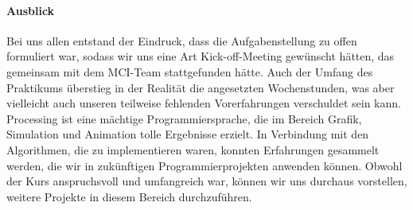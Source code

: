 \documentclass[../mciAusarbeitung.tex]{subfiles}
\begin{document}
\paragraph{Ausblick}
Bei uns allen entstand der Eindruck, dass die Aufgabenstellung zu offen formuliert war, sodass wir uns eine Art Kick-off-Meeting gewünscht hätten, das gemeinsam mit dem MCI-Team stattgefunden hätte. Auch der Umfang des Praktikums überstieg in der Realität die angesetzten Wochenstunden, was aber vielleicht auch unseren teilweise fehlenden Vorerfahrungen verschuldet sein kann. Processing ist eine mächtige Programmiersprache, die im Bereich Grafik, Simulation und Animation tolle Ergebnisse erzielt. In Verbindung mit den Algorithmen, die zu implementieren waren, konnten Erfahrungen gesammelt werden, die wir in zukünftigen Programmierprojekten anwenden können. Obwohl der Kurs anspruchsvoll und umfangreich war, können wir uns durchaus vorstellen, weitere Projekte in diesem Bereich durchzuführen.
\end{document}
